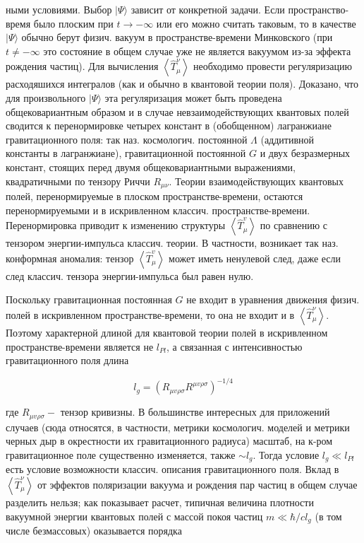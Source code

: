 \documentclass[10pt]{article}
\begin{document}
ными условиями. Выбор $|\Psi\rangle$ зависит от конкретной задачи. Если пространство- время было плоским при $t \rightarrow-\infty$ или его можно считать таковым, то в качестве $|\Psi\rangle$ обычно берут физич. вакуум в пространстве-времени Минковского (при $t \neq-\infty$ это состояние в общем случае уже не является вакуумом из-за эффекта рождения частиц). Для вычисления $\left\langle\hat{T}_{\mu}^{\nu}\right\rangle$ необходимо провести регуляризацию расходяшихся интегралов (как и обычно в квантовой теории поля). Доказано, что для произвольного $|\Psi\rangle$ эта регуляризация может быть проведена общековариантным образом и в случае невзаимодействующих квантовых полей сводится к перенормировке четырех констант в (обобщенном) лагранжиане гравитационного поля: так наз. космологич. постоянной $\Lambda$ (аддитивной константы в лагранжиане), гравитационной постоянной $G$ и двух безразмерных констант, стоящих перед двумя общековариантными выражениями, квадратичными по тензору Риччи $R_{\mu \nu}$. Теории взаимодействующих квантовых полей, перенормируемые в плоском пространстве-времени, остаются перенормируемыми и в искривленном классич. пространстве-времени. Перенормировка приводит к изменению структуры $\left\langle\hat{T}_{\mu}^{v}\right\rangle$ по сравнению с тензором энергии-импульса классич. теории. В частности, возникает так наз. конформная аномалия: тензор $\left\langle\hat{T}_{\mu}^{v}\right\rangle$ может иметь ненулевой след, даже если след классич. тензора энергии-импульса был равен нулю.



Поскольку гравитационная постоянная $G$ не входит в уравнения движения физич. полей в искривленном пространстве-времени, то она не входит и в $\left\langle\hat{T}_{\mu}^{\nu}\right\rangle$. Поэтому характерной длиной для квантовой теории полей в искривленном пространстве-времени является не $l_{P l}$, а связанная с интенсивностью гравитационного поля длина



\[

l_{g}=\left(R_{\mu v \rho \sigma} R^{\mu v \rho \sigma}\right)^{-1 / 4}

\]



где $R_{\mu v \rho \sigma}-$ тензор кривизны. В большинстве интересных для приложений случаев (сюда относятся, в частности, метрики космологич. моделей и метрики черных дыр в окрестности их гравитационного радиуса) масштаб, на к-ром гравитационное поле существенно изменяется, также $\sim l_{g}$. Тогда условие $l_{g} \ll l_{P l}$ есть условие возможности классич. описания гравитационного поля. Вклад в $\left\langle\hat{T}_{\mu}^{\nu}\right\rangle$ от эффектов поляризации вакуума и рождения пар частиц в общем случае разделить нельзя; как показывает расчет, типичная величина плотности вакуумной энергии квантовых полей с массой покоя частиц $m \ll \hbar / c l_{g}$ (в том числе безмассовых) оказывается порядка
\end{document}
